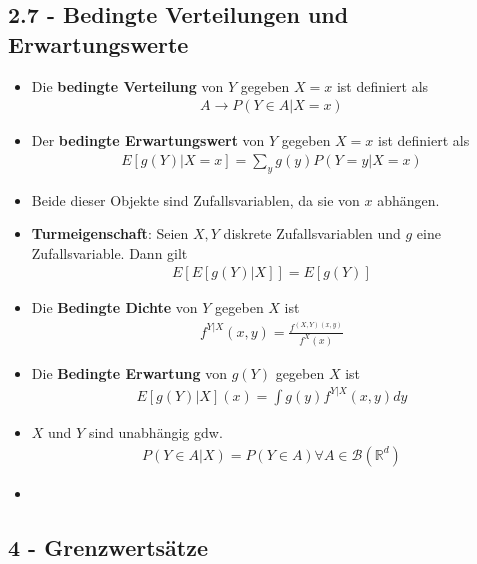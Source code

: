 \documentclass{scrartcl}
\newcommand{\borel}{\mc{B}(\mathbb{R}^d)}
\newcommand{\mc}[1]{\mathcal{#1}}
\begin{document}
\subsection*{2.7 - Bedingte Verteilungen und Erwartungswerte}
\begin{itemize}
    \item Die \textbf{bedingte Verteilung} von $Y$ gegeben $X = x$ ist definiert als
    \begin{align*}
        A \to P(Y \in A | X = x)
    \end{align*}
    \item Der \textbf{bedingte Erwartungswert} von $Y$ gegeben $X = x$ ist definiert als
    \begin{align*}
        E[g(Y) | X = x] = \sum_y g(y) P(Y = y|X = x)
    \end{align*}
    \item Beide dieser Objekte sind Zufallsvariablen, da sie von $x$ abhängen.
    \item \textbf{Turmeigenschaft}: Seien $X,Y$ diskrete Zufallsvariablen und $g$ eine Zufallsvariable. Dann gilt
    \begin{align*}
        E[E[g(Y) | X]] = E[g(Y)]
    \end{align*}
    \item Die \textbf{Bedingte Dichte} von $Y$ gegeben $X$ ist
    \begin{align*}
        f^{Y|X}(x,y) = \frac{f^{(X,Y)(x,y)}}{f^X(x)}
    \end{align*}
    \item Die \textbf{Bedingte Erwartung} von $g(Y)$ gegeben $X$ ist
    \begin{align*}
        E[g(Y) | X](x) = \int g(y)f^{Y|X}(x,y)dy
    \end{align*}
    \item $X$ und $Y$ sind unabhängig gdw.
    \begin{align*}
        P(Y \in A | X) = P(Y \in A) \forall A \in \borel
    \end{align*}
    \item
\end{itemize}
\subsection*{4 - Grenzwertsätze}
\end{document}
